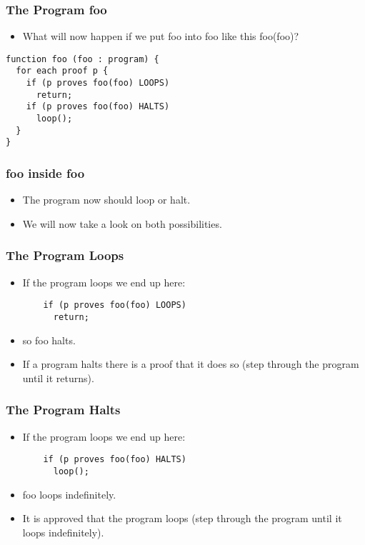 \documentclass[aspectratio=169]{beamer}
\begin{document}
\begin{frame}[fragile]
	\frametitle{The Program foo}
	\begin{itemize}
		\item What will now happen if we put foo into foo like this foo(foo)?
	\end{itemize}
	\begin{center}
	  \begin{lstlisting}[frame=single]
function foo (foo : program) {
  for each proof p {
    if (p proves foo(foo) LOOPS) 
      return;
    if (p proves foo(foo) HALTS)
      loop();
  }
}
   \end{lstlisting}
   	\end{center}
\end{frame}

\begin{frame}
	\frametitle{foo inside foo}
	\begin{itemize}
		\item The program now should loop or halt.
		\item We will now take a look on both possibilities. 
	\end{itemize}
\end{frame}

\begin{frame}[fragile]
	\frametitle{The Program Loops}
	\begin{itemize}
		\item If the program loops we end up here:
		\begin{center}
	  \begin{lstlisting}
    if (p proves foo(foo) LOOPS) 
      return;
   \end{lstlisting}
   	\end{center}
		\item so foo halts.
		\item If a program halts there is a proof that it does so (step through the program until it returns).
	\end{itemize}
\end{frame}

\begin{frame}[fragile]
	\frametitle{The Program Halts}
	\begin{itemize}
		\item If the program loops we end up here:
		\begin{center}
	  \begin{lstlisting}
    if (p proves foo(foo) HALTS)
      loop();
   \end{lstlisting}
   	\end{center}
		\item foo loops indefinitely.
		\item It is approved that the program loops (step through the program until it loops indefinitely).
	\end{itemize}
\end{frame}
\end{document}
